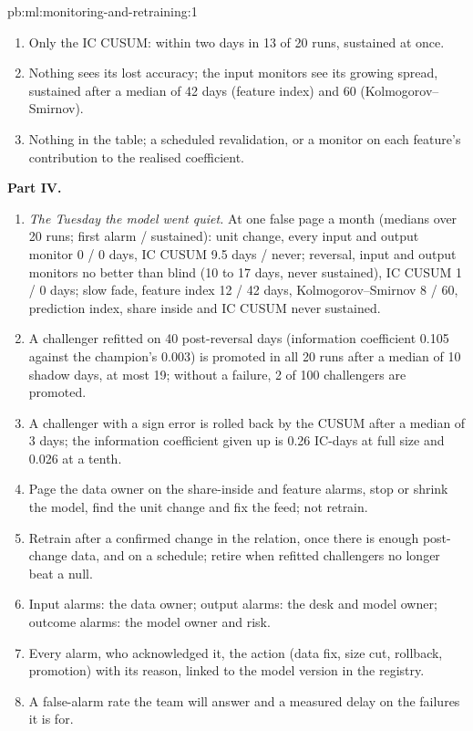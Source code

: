 \begin{solution}{pb:ml:monitoring-and-retraining:1}
\begin{enumerate}[resume]
9.5 days and never insists.
\item Only the IC CUSUM: within two days in 13 of 20 runs, sustained at once.
\item Nothing sees its lost accuracy; the input monitors see its growing spread, sustained after a median of 42 days (feature
index) and 60 (Kolmogorov--Smirnov).
\item Nothing in the table; a scheduled revalidation, or a monitor on each feature's contribution to the realised coefficient.
\end{enumerate}
\textbf{Part IV.}
\begin{enumerate}[resume]
\item \emph{The Tuesday the model went quiet.} At one false page a month (medians over 20 runs; first alarm / sustained):
unit change, every input and output monitor 0 / 0 days, IC CUSUM 9.5 days / never; reversal, input and output monitors no better
than blind (10 to 17 days, never sustained), IC CUSUM 1 / 0 days; slow fade, feature index 12 / 42 days, Kolmogorov--Smirnov 8 /
60, prediction index, share inside and IC CUSUM never sustained.
\item A challenger refitted on 40 post-reversal days (information coefficient 0.105 against the champion's 0.003) is promoted in
all 20 runs after a median of 10 shadow days, at most 19; without a failure, 2 of 100 challengers are promoted.
\item A challenger with a sign error is rolled back by the CUSUM after a median of 3 days; the information coefficient given up
is 0.26 IC-days at full size and 0.026 at a tenth.
\item Page the data owner on the share-inside and feature alarms, stop or shrink the model, find the unit change and fix the feed;
not retrain.
\item Retrain after a confirmed change in the relation, once there is enough post-change data, and on a schedule; retire when
refitted challengers no longer beat a null.
\item Input alarms: the data owner; output alarms: the desk and model owner; outcome alarms: the model owner and risk.
\item Every alarm, who acknowledged it, the action (data fix, size cut, rollback, promotion) with its reason, linked to the model
version in the registry.
\item A false-alarm rate the team will answer and a measured delay on the failures it is for.
\end{enumerate}
\end{solution}

